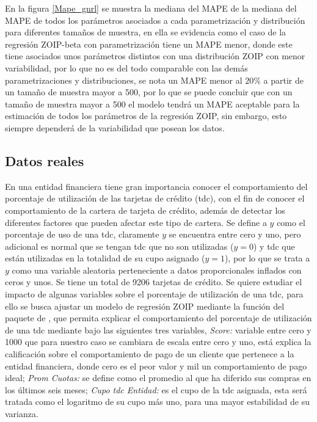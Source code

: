 En la figura \ref{Mape_gnrl} se muestra la mediana del MAPE de la mediana del MAPE de todos los par\'{a}metros asociados a cada parametrizaci\'{o}n y distribuci\'{o}n para diferentes tama\~{n}os de muestra, en ella se evidencia como el caso de la regresi\'{o}n ZOIP-beta con parametrizaci\'{o}n \cite{Stasinopoulos2} tiene un MAPE menor, donde este tiene asociados unos par\'{a}metros distintos con una distribuci\'{o}n ZOIP con menor variabilidad, por lo que no es del todo comparable con las dem\'{a}s parametrizaciones y distribuciones, se nota un MAPE menor al $20\%$ a partir de un tama\~{n}o de muestra mayor a 500, por lo que se puede concluir que con un tama\~{n}o de muestra mayor a 500 el modelo tendr\'{a} un MAPE aceptable para la estimaci\'{o}n de todos los par\'{a}metros de la regresi\'{o}n ZOIP, sin embargo, esto siempre depender\'{a} de la variabilidad que posean los datos.

\subsection{Datos reales}
En una entidad financiera tiene gran importancia conocer el comportamiento del porcentaje de utilizaci\'{o}n de las tarjetas de cr\'{e}dito (tdc), con el fin de conocer el comportamiento de la cartera de tarjeta de cr\'{e}dito, adem\'{a}s de detectar los diferentes factores que pueden afectar este tipo de cartera. Se define a $y$ como el porcentaje de uso de una tdc, claramente $y$ se encuentra entre cero y uno, pero adicional es normal que se tengan tdc que no son utilizadas ($y=0$) y tdc que est\'{a}n utilizadas en la totalidad de su cupo asignado ($y=1$), por lo que se trata a $y$ como una variable aleatoria perteneciente a datos proporcionales inflados con ceros y unos. Se tiene un total de 9206 tarjetas de cr\'{e}dito. Se quiere estudiar el impacto de algunas variables sobre el porcentaje de utilizaci\'{o}n de una tdc, para ello se busca ajustar un modelo de regresi\'{o}n ZOIP mediante la funci\'{o}n  del paquete  de , que permita explicar el comportamiento del porcentaje de utilizaci\'{o}n de una tdc mediante bajo las siguientes tres variables, \textsl{Score:} variable entre cero y 1000 que para nuestro caso se cambiara de escala entre cero y uno, est\'{a} explica la calificaci\'{o}n sobre el comportamiento de pago de un cliente que pertenece a la entidad financiera, donde cero es el peor valor y mil un comportamiento de pago ideal; \textsl{Prom Cuotas:} se define como el promedio al que ha diferido sus compras en los \'{u}ltimos seis meses; \textsl{Cupo tdc Entidad:} es el cupo de la tdc asignada, esta ser\'{a} tratada como el logaritmo de su cupo m\'{a}s uno, para una mayor estabilidad de su varianza.

